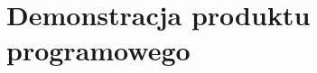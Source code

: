 \documentclass[../main.tex]{subfiles}
\begin{document}
\section{Demonstracja produktu programowego}
\end{document}
